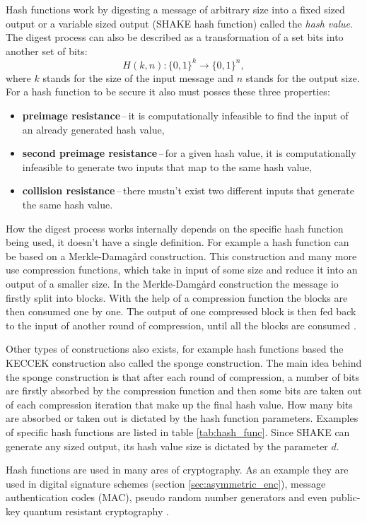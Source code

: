 Hash functions work by digesting a message of arbitrary size into a fixed sized output or a variable sized output (SHAKE hash function) called the \textit{hash value}. The digest process can also be described as a transformation of a set bits into another set of bits:
\begin{equation}
  H(k, n): \{0,1\}^k \rightarrow \{0,1\}^n,
\end{equation}
where $k$ stands for the size of the input message and $n$ stands for the output size. For a hash function to be secure it also must posses these three properties\cite{Paar2010}:
\begin{itemize}
  \item \textbf{preimage resistance}\,--\,it is computationally infeasible to find the input of an already generated hash value,
  \item \textbf{second preimage resistance}\,--\,for a given hash value, it is computationally infeasible to generate two inputs that map to the same hash value,
  \item \textbf{collision resistance}\,--\,there mustn't exist two different inputs that generate the same hash value.
\end{itemize}

How the digest process works internally depends on the specific hash function being used, it doesn't have a single definition. For example a hash function can be based on a Merkle-Damag\aa rd construction. This construction and many more use compression functions, which take in input of some size and reduce it into an output of a smaller size. In the Merkle-Damg\aa rd construction the message io firstly split into blocks. With the help of a compression function the blocks are then consumed one by one. The output of one compressed block is then fed back to the input of another round of compression, until all the blocks are consumed \cite{Smart2004}. 

Other types of constructions also exists, for example hash functions based the KECCEK construction also called the sponge construction. The main idea behind the sponge construction is that after each round of compression, a number of bits are firstly absorbed by the compression function and then some bits are taken out of each compression iteration that make up the final hash value. How many bits are absorbed or taken out is dictated by the hash function parameters. \cite{1Od8f4TuMxetfmHu} Examples of specific hash functions are listed in table \ref{tab:hash_func}. Since SHAKE can generate any sized output, its hash value size is dictated by the parameter $d$.


Hash functions are used in many ares of cryptography. As an example they are used in digital signature schemes (section \ref{sec:asymmetric_enc}), message authentication codes (\acs{MAC}), pseudo random number generators and even public-key quantum resistant cryptography \cite{Chen2016}. 


